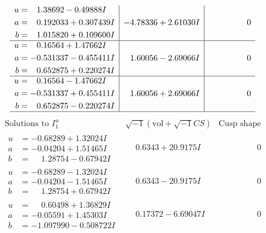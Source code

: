 \documentclass[1p]{elsarticle_modified}
\theoremstyle{definition}
\newcommand{\I}{\sqrt{-1}}
\begin{document}
$$\begin{array}{c|c|c}
\begin{aligned}
u &= \phantom{-}1.38692 - 0.49888 I \\
a &= \phantom{-}0.192033 + 0.307439 I \\
b &= \phantom{-}1.015820 + 0.109600 I\end{aligned}
 & -4.78336 + 2.61030 I & \phantom{-0.000000 } 0 \\ \hline\begin{aligned}
u &= \phantom{-}0.16564 + 1.47662 I \\
a &= -0.531337 - 0.455411 I \\
b &= \phantom{-}0.652875 + 0.220274 I\end{aligned}
 & \phantom{-}1.60056 - 2.69066 I & \phantom{-0.000000 } 0 \\ \hline\begin{aligned}
u &= \phantom{-}0.16564 - 1.47662 I \\
a &= -0.531337 + 0.455411 I \\
b &= \phantom{-}0.652875 - 0.220274 I\end{aligned}
 & \phantom{-}1.60056 + 2.69066 I & \phantom{-0.000000 } 0\\
 \hline 
 \end{array}$$\newpage$$\begin{array}{c|c|c}  
\text{Solutions to }I^u_{1}& \I (\text{vol} + \sqrt{-1}CS) & \text{Cusp shape}\\
 \hline 
\begin{aligned}
u &= -0.68289 + 1.32024 I \\
a &= -0.04204 + 1.51465 I \\
b &= \phantom{-}1.28754 - 0.67942 I\end{aligned}
 & \phantom{-}0.6343 + 20.9175 I & \phantom{-0.000000 } 0 \\ \hline\begin{aligned}
u &= -0.68289 - 1.32024 I \\
a &= -0.04204 - 1.51465 I \\
b &= \phantom{-}1.28754 + 0.67942 I\end{aligned}
 & \phantom{-}0.6343 - 20.9175 I & \phantom{-0.000000 } 0 \\ \hline\begin{aligned}
u &= \phantom{-}0.60498 + 1.36829 I \\
a &= -0.05591 + 1.45303 I \\
b &= -1.097990 - 0.508722 I\end{aligned}
 & \phantom{-}0.17372 - 6.69047 I & \phantom{-0.000000 } 0 \\ \hline\begin{aligned}

\end{aligned}
\end{array}$$
\end{document}
